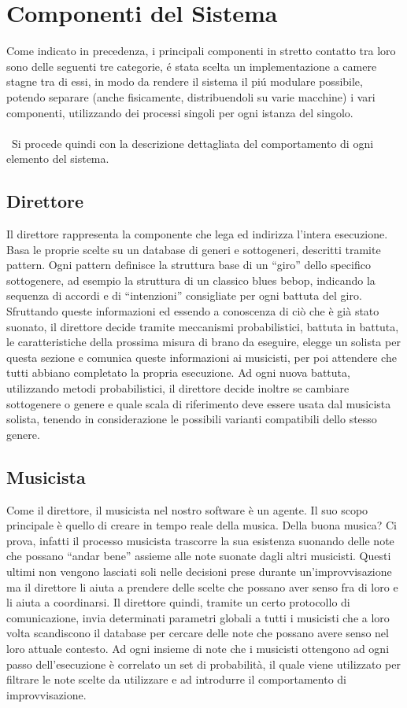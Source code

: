 \section{Componenti del Sistema}
Come indicato in precedenza, i principali componenti in stretto contatto
tra loro sono delle seguenti tre categorie, \'e stata scelta un implementazione
a camere stagne tra di essi, in modo da rendere il sistema il pi\'u modulare
possibile, potendo separare (anche fisicamente, distribuendoli su varie macchine)
i vari componenti, utilizzando dei processi singoli per ogni istanza del singolo.\\\
\\\
Si procede quindi con la descrizione dettagliata del comportamento di ogni
elemento del sistema.

\subsection{Direttore}
Il direttore rappresenta la componente che lega ed indirizza l'intera esecuzione. Basa le proprie scelte su un database di generi e sottogeneri, descritti tramite pattern. 
Ogni pattern definisce la struttura base di un ``giro'' dello specifico sottogenere, ad esempio la struttura di un classico blues bebop, indicando la sequenza di accordi e di ``intenzioni'' consigliate per ogni battuta del giro. 
Sfruttando queste informazioni ed essendo a conoscenza di ciò che è già stato suonato, il direttore decide tramite meccanismi probabilistici, battuta in battuta, le caratteristiche della prossima misura di brano da eseguire, elegge un solista per questa sezione e comunica queste informazioni ai musicisti, per poi attendere che tutti abbiano completato la propria esecuzione.
Ad ogni nuova battuta, utilizzando metodi probabilistici, il direttore decide inoltre se cambiare sottogenere o genere e quale scala di riferimento deve essere usata dal musicista solista, tenendo in considerazione le possibili varianti compatibili dello stesso genere.

\subsection{Musicista}
Come il direttore, il musicista nel nostro software è un agente. 
Il suo scopo principale è quello di creare in tempo reale della musica. 
Della buona musica? Ci prova, infatti il processo musicista trascorre la
sua esistenza suonando delle note che possano ``andar bene'' assieme alle note
 suonate dagli altri musicisti. Questi ultimi non vengono lasciati soli nelle 
decisioni prese durante un'improvvisazione ma il direttore li aiuta a prendere 
delle scelte che possano aver senso fra di loro e li aiuta a coordinarsi. 
Il direttore quindi, tramite un certo protocollo di comunicazione, 
invia determinati parametri globali a tutti i musicisti che a loro volta 
scandiscono il database per cercare delle note che possano avere senso nel loro 
attuale contesto. 
Ad ogni insieme di note che i musicisti ottengono ad ogni passo dell'esecuzione
 è correlato un set di probabilità, il quale viene utilizzato per filtrare le 
note scelte da utilizzare e ad introdurre il comportamento di improvvisazione.

